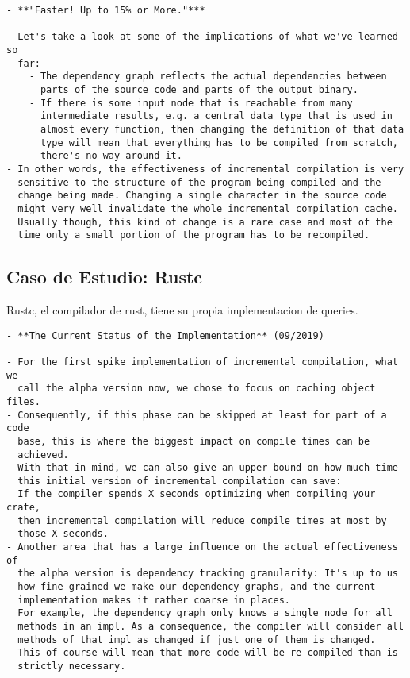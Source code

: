 \documentclass[12pt, a4paper]{report}
\begin{document}
\begin{verbatim}
- **"Faster! Up to 15% or More."***

- Let's take a look at some of the implications of what we've learned so
  far:
	- The dependency graph reflects the actual dependencies between
	  parts of the source code and parts of the output binary.
	- If there is some input node that is reachable from many
	  intermediate results, e.g. a central data type that is used in
	  almost every function, then changing the definition of that data
	  type will mean that everything has to be compiled from scratch,
	  there's no way around it.
- In other words, the effectiveness of incremental compilation is very
  sensitive to the structure of the program being compiled and the
  change being made. Changing a single character in the source code
  might very well invalidate the whole incremental compilation cache.
  Usually though, this kind of change is a rare case and most of the
  time only a small portion of the program has to be recompiled.
\end{verbatim}

\subsection*{Caso de Estudio: Rustc}

Rustc, el compilador de rust, tiene su propia implementacion de queries.

\begin{verbatim}
- **The Current Status of the Implementation** (09/2019)

- For the first spike implementation of incremental compilation, what we
  call the alpha version now, we chose to focus on caching object files.
- Consequently, if this phase can be skipped at least for part of a code
  base, this is where the biggest impact on compile times can be
  achieved.
- With that in mind, we can also give an upper bound on how much time
  this initial version of incremental compilation can save:
  If the compiler spends X seconds optimizing when compiling your crate,
  then incremental compilation will reduce compile times at most by
  those X seconds.
- Another area that has a large influence on the actual effectiveness of
  the alpha version is dependency tracking granularity: It's up to us
  how fine-grained we make our dependency graphs, and the current
  implementation makes it rather coarse in places.
  For example, the dependency graph only knows a single node for all
  methods in an impl. As a consequence, the compiler will consider all
  methods of that impl as changed if just one of them is changed.
  This of course will mean that more code will be re-compiled than is
  strictly necessary.
\end{verbatim}
\end{document}
